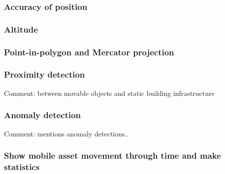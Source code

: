 \documentclass{article}
\begin{document}
\subsubsection{Accuracy of position}
\subsubsection{Altitude}
\subsubsection{Point-in-polygon and Mercator projection}
\subsubsection{Proximity detection}
Comment: between movable objects and static building infrastructure
\subsubsection{Anomaly detection}
Comment: \cite{li_digital_2022} mentions anomaly detections..
\subsubsection{Show mobile asset movement through time and make statistics}




\newpage
\printbibliography
\end{document}
